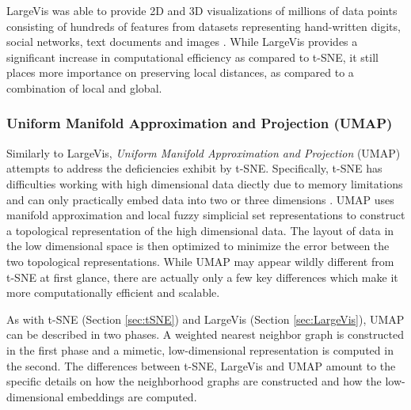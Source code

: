 LargeVis was able to provide 2D and 3D visualizations of millions of data points consisting of hundreds of features from datasets representing hand-written digits, social networks, text documents and images \citep{Tang2016LargeVis}.  While LargeVis provides a significant increase in computational efficiency as compared to t-SNE, it still places more importance on preserving local distances, as compared to a combination of local and global.

\subsubsection{Uniform Manifold Approximation and Projection (UMAP)} \label{sec:UMAP}
Similarly to LargeVis, \textit{Uniform Manifold Approximation and Projection} (UMAP) \citep{McInnes2018UMAP} attempts to address the deficiencies exhibit by t-SNE. Specifically, t-SNE has difficulties working with high dimensional data diectly due to memory limitations and can only practically embed data into two or three dimensions \citep{Tang2016LargeVis}. UMAP uses manifold approximation and local fuzzy simplicial set representations to construct a topological representation of the high dimensional data.  The layout of data in the low dimensional space is then optimized to minimize the error between the two topological representations.  While UMAP may appear wildly different from t-SNE at first glance, there are actually only a few key differences which make it more computationally efficient and scalable. 

As with t-SNE (Section \ref{sec:tSNE}) and LargeVis (Section \ref{sec:LargeVis}), UMAP can be described in two phases.  A weighted nearest neighbor graph is constructed in the first phase and a mimetic, low-dimensional representation is computed in the second.  The differences between t-SNE, LargeVis and UMAP amount to the specific details on how the neighborhood graphs are constructed and how the low-dimensional embeddings are computed.

